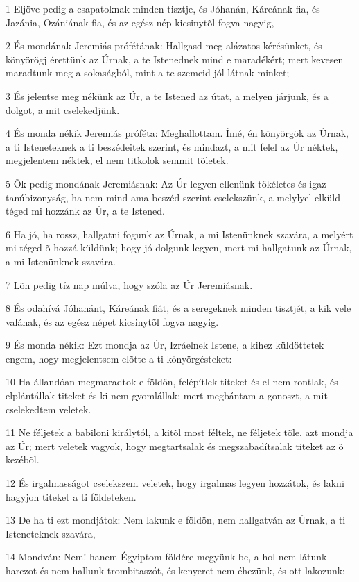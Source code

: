 \par 1 Eljöve pedig a csapatoknak minden tisztje, és Jóhanán, Káreának fia, és Jazánia, Ozániának fia, és az egész nép kicsinytõl fogva nagyig,
\par 2 És mondának Jeremiás prófétának: Hallgasd meg alázatos kérésünket, és könyörögj érettünk az Úrnak, a te Istenednek mind e maradékért; mert kevesen maradtunk meg a sokaságból, mint a te szemeid jól látnak minket;
\par 3 És jelentse meg nékünk az Úr, a te Istened az útat, a melyen járjunk, és a dolgot, a mit cselekedjünk.
\par 4 És monda nékik Jeremiás próféta: Meghallottam. Ímé, én könyörgök az Úrnak, a ti Isteneteknek a ti beszédeitek szerint, és mindazt, a mit felel az Úr néktek, megjelentem néktek, el nem titkolok semmit tõletek.
\par 5 Õk pedig mondának Jeremiásnak: Az Úr legyen ellenünk tökéletes és igaz tanúbizonyság, ha nem mind ama beszéd szerint cselekszünk, a melylyel elküld téged mi hozzánk az Úr, a te Istened.
\par 6 Ha jó, ha rossz, hallgatni fogunk az Úrnak, a mi Istenünknek szavára, a melyért mi téged õ hozzá küldünk; hogy jó dolgunk legyen, mert mi hallgatunk az Úrnak, a mi Istenünknek szavára.
\par 7 Lõn pedig tíz nap múlva, hogy szóla az Úr Jeremiásnak.
\par 8 És odahívá Jóhanánt, Káreának fiát, és a seregeknek minden tisztjét, a kik vele valának, és az egész népet kicsinytõl fogva nagyig.
\par 9 És monda nékik: Ezt mondja az Úr, Izráelnek Istene, a kihez küldöttetek engem, hogy megjelentsem elõtte a ti könyörgésteket:
\par 10 Ha állandóan megmaradtok e földön, felépítlek titeket és el nem rontlak, és elplántállak titeket és ki nem gyomlállak: mert megbántam a gonoszt, a mit cselekedtem veletek.
\par 11 Ne féljetek a babiloni királytól, a kitõl most féltek, ne féljetek tõle, azt mondja az Úr; mert veletek vagyok, hogy megtartsalak és megszabadítsalak titeket az õ kezébõl.
\par 12 És irgalmasságot cselekszem veletek, hogy irgalmas legyen hozzátok, és lakni hagyjon titeket a ti földeteken.
\par 13 De ha ti ezt mondjátok: Nem lakunk e földön, nem hallgatván az Úrnak, a ti Isteneteknek szavára,
\par 14 Mondván: Nem! hanem Égyiptom földére megyünk be, a hol nem látunk harczot és nem hallunk trombitaszót, és kenyeret nem éhezünk, és ott lakozunk:
